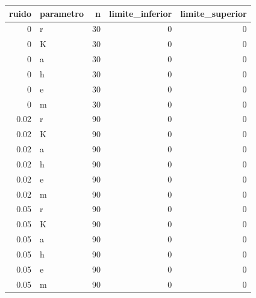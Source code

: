 \begin{tabular}{rlrrr}
\toprule
ruido & parametro & n & limite\_inferior & limite\_superior \\
\midrule
0 & r & 30 & 0 & 0 \\
0 & K & 30 & 0 & 0 \\
0 & a & 30 & 0 & 0 \\
0 & h & 30 & 0 & 0 \\
0 & e & 30 & 0 & 0 \\
0 & m & 30 & 0 & 0 \\
0.02 & r & 90 & 0 & 0 \\
0.02 & K & 90 & 0 & 0 \\
0.02 & a & 90 & 0 & 0 \\
0.02 & h & 90 & 0 & 0 \\
0.02 & e & 90 & 0 & 0 \\
0.02 & m & 90 & 0 & 0 \\
0.05 & r & 90 & 0 & 0 \\
0.05 & K & 90 & 0 & 0 \\
0.05 & a & 90 & 0 & 0 \\
0.05 & h & 90 & 0 & 0 \\
0.05 & e & 90 & 0 & 0 \\
0.05 & m & 90 & 0 & 0 \\
\bottomrule
\end{tabular}
